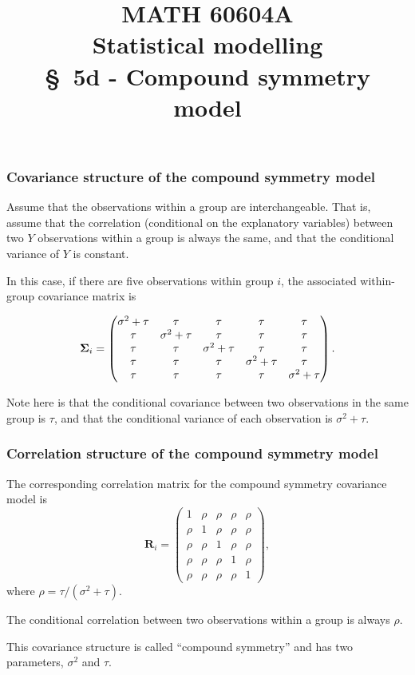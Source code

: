 \documentclass{beamer}
\title[\color{white}{MATH 60604A \S~5d - Compound symmetry model}]{\texorpdfstring{MATH 60604A \\Statistical modelling \\ \S~5d - Compound symmetry model}{MATH 60604A \\Statistical modelling \\ \S~5d - Compound symmetry model}}
\author{}
\institute{HEC Montréal\\
Department of Decision Sciences}
\date{}
\begin{document}
\frame{\titlepage}


\begin{frame}
\frametitle{Covariance structure of the compound symmetry model}
\bi
\item Assume that the observations within a group are interchangeable. That is, 
assume that the correlation (conditional on the explanatory variables) between two $Y$ observations within a group is always the same, and that the conditional variance of $Y$ is constant.
\item In this case, if there are five observations within group $i$, the associated within-group covariance matrix is

{\small \[
\boldsymbol {\Sigma}_i=
  \begin{pmatrix}
    \sigma^2+\tau & \tau & \tau & \tau & \tau\\
    \tau & \sigma^2+\tau & \tau& \tau & \tau\\
    \tau & \tau & \sigma^2+\tau & \tau & \tau\\
    \tau & \tau & \tau & \sigma^2+\tau & \tau\\
    \tau & \tau & \tau & \tau & \sigma^2+\tau
  \end{pmatrix}.
\]
}
\item Note here is that the conditional covariance between two observations in the same group is $\tau$, and that the conditional variance of each observation is $\sigma^2+\tau$.
\ei
\end{frame}

\begin{frame}
\frametitle{Correlation structure of the compound symmetry model}
The corresponding correlation matrix for the compound symmetry covariance model is
\[
\mathbf{R}_i=
  \begin{pmatrix}
   1 & \rho & \rho & \rho & \rho\\
    \rho &1 & \rho & \rho & \rho\\
   \rho & \rho & 1 &\rho & \rho\\
   \rho & \rho & \rho & 1 &\rho\\
   \rho & \rho & \rho & \rho &1
  \end{pmatrix},
\]
where $\rho=\tau/(\sigma^2+\tau)$.
\bi
\item The conditional correlation between two observations within a group
is always $\rho$. 
\item This covariance structure is called ``\alert{compound symmetry}'' and has two parameters, $\sigma^2$ and $\tau$.
\ei
\end{frame}
\end{document}
